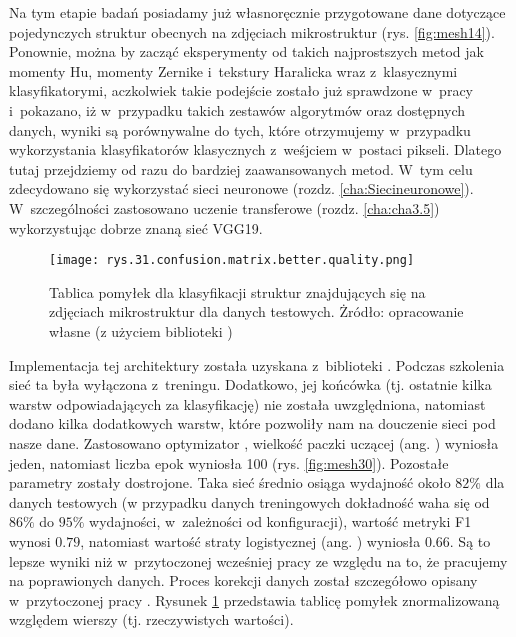 Na tym etapie badań posiadamy już własnoręcznie przygotowane dane dotyczące pojedynczych struktur obecnych na zdjęciach mikrostruktur (rys. \ref{fig:mesh14}). Ponownie, można by zacząć eksperymenty od takich najprostszych metod jak momenty Hu, momenty Zernike i~tekstury Haralicka wraz z~klasycznymi klasyfikatorymi, aczkolwiek takie podejście zostało już sprawdzone w~pracy \cite{Reczek21} i~pokazano, iż w~przypadku takich zestawów algorytmów oraz dostępnych danych, wyniki są porównywalne do tych, które otrzymujemy w~przypadku wykorzystania klasyfikatorów klasycznych z~weśjciem w~postaci pikseli. Dlatego tutaj przejdziemy od razu do bardziej zaawansowanych metod. W~tym celu zdecydowano się wykorzystać sieci neuronowe (rozdz. \ref{cha:Siecineuronowe}). W~szczególności zastosowano uczenie transferowe (rozdz. \ref{cha:cha3.5}) wykorzystując dobrze znaną sieć VGG19. 
\begin{figure}[h]
    \centering
    \texttt{[image: rys.31.confusion.matrix.better.quality.png]}  %
    \caption{Tablica pomyłek dla klasyfikacji struktur znajdujących się na zdjęciach mikrostruktur dla danych testowych. Żródło: opracowanie własne (z użyciem biblioteki )}
    \label{fig:mesh29}
\end{figure}
Implementacja tej architektury została uzyskana z~biblioteki . Podczas szkolenia sieć ta była wyłączona z~treningu. Dodatkowo, jej końcówka (tj. ostatnie kilka warstw odpowiadających za klasyfikację) nie została uwzględniona, natomiast dodano kilka dodatkowych warstw, które pozwoliły nam na douczenie sieci pod nasze dane. Zastosowano optymizator , wielkość paczki uczącej (ang. ) wyniosła jeden, natomiast liczba epok wyniosła 100 (rys. \ref{fig:mesh30}). Pozostałe parametry zostały dostrojone. Taka sieć średnio osiąga wydajność około $82\%$ dla danych testowych (w przypadku danych treningowych dokładność waha się od $86\%$ do $95\%$ wydajności, w~zależności od konfiguracji), wartość metryki F1 wynosi $0.79$, natomiast wartość straty logistycznej (ang. ) wyniosła $0.66$. Są to lepsze wyniki niż w~przytoczonej wcześniej pracy \cite{Reczek21} ze względu na to, że pracujemy na poprawionych danych. Proces korekcji danych został szczegółowo opisany w~przytoczonej pracy \cite{Reczek21}. Rysunek \ref{fig:mesh29} przedstawia tablicę pomyłek znormalizowaną względem wierszy (tj. rzeczywistych wartości). 
